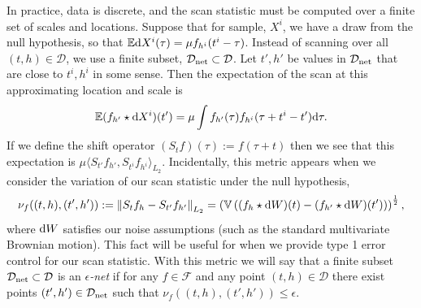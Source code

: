 In practice, data is discrete, and the scan statistic must be computed over a finite set of scales and locations.
Suppose that for sample, $X^i$, we have a draw from the null hypothesis, so that $\mathbb E {\rm d} X^i(\tau) = \mu f_{h^i} (t^i - \tau)$.
Instead of scanning over all $(t,h) \in \mathcal D$, we use a finite subset, $\mathcal D_{\rm net} \subset \mathcal D$.
Let $t',h'$ be values in $\mathcal D_{\rm net}$ that are close to $t^i, h^i$ in some sense.
Then the expectation of the scan at this approximating location and scale is
$$
\mathbb E (f_{h'} \star {\rm d}X^i)(t') = \mu \int f_{h'}(\tau) f_{h^i} (\tau + t^i - t') {\rm d} \tau.
$$
If we define the shift operator $(S_t f)(\tau) := f(\tau + t)$ then we see that this expectation is $\mu \langle S_{t'} f_{h'} ,S_{t^i} f_{h^i} \rangle_{L_2}$.
Incidentally, this metric appears when we consider the variation of our scan statistic under the null hypothesis,
$$
\nu_f((t,h),(t',h')) := \left\| S_{t} f_h - S_{t'} f_{h'} \right\|_{L_2} = \left(\mathbb V \left( (f_h \star {\rm d} W)(t) - (f_{h'} \star {\rm d} W)(t') \right)  \right)^{\frac 12},
$$
where ${\rm d}W$ satisfies our noise assumptions (such as the standard multivariate Brownian motion).
This fact will be useful for when we provide type 1 error control for our scan statistic.
With this metric we will say that a finite subset $\mathcal D_{\rm net} \subset \mathcal D$ is an {\em $\epsilon$-net} if for any $f\in \mathcal F$ and any point $(t,h) \in \mathcal D$ there exist points $(t',h') \in \mathcal D_{\rm net}$ such that $\nu_f((t,h),(t',h')) \le \epsilon$.


